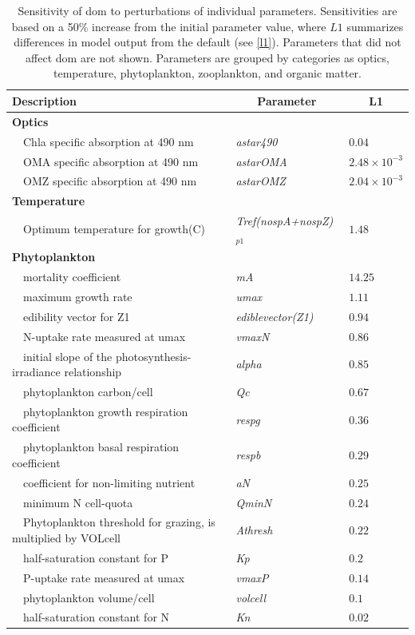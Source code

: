 \documentclass[preprint]{elsarticle}\usepackage[]{graphicx}\usepackage[]{color}
\begin{document}
\begin{table}[!tbp]
{\footnotesize
\caption{Sensitivity of \acl{dom} to perturbations of individual parameters.  Sensitivities are based on a 50\% increase from the initial parameter value, where $L1$ summarizes differences in model output from the default (see \cref{l1}).  Parameters that did not affect \acl{dom} are not shown.  Parameters are grouped by categories as optics, temperature, phytoplankton, zooplankton, and organic matter.\label{tab:om2sens}} 
\begin{center}
\begin{tabular}{lll}
\hline\hline
\multicolumn{1}{l}{Description}&\multicolumn{1}{c}{Parameter}&\multicolumn{1}{c}{L1}\tabularnewline
\hline
{\bfseries Optics}&&\tabularnewline
~~Chla specific absorption at 490 nm&\textit{astar490}&$0.04$\tabularnewline
~~OMA specific absorption at 490 nm&\textit{astarOMA}&$2.48\times 10^{-3}$\tabularnewline
~~OMZ specific absorption at 490 nm&\textit{astarOMZ}&$2.04\times 10^{-3}$\tabularnewline
\hline
{\bfseries Temperature}&&\tabularnewline
~~Optimum temperature for growth(C)&\textit{Tref(nospA+nospZ)$_{p1}$}&$1.48$\tabularnewline
\hline
{\bfseries Phytoplankton}&&\tabularnewline
~~mortality coefficient&\textit{mA}&$14.25$\tabularnewline
~~maximum growth rate&\textit{umax}&$1.11$\tabularnewline
~~edibility vector for Z1&\textit{ediblevector(Z1)}&$0.94$\tabularnewline
~~N-uptake rate measured at umax&\textit{vmaxN}&$0.86$\tabularnewline
~~initial slope of the photosynthesis-irradiance relationship&\textit{alpha}&$0.85$\tabularnewline
~~phytoplankton carbon/cell&\textit{Qc}&$0.67$\tabularnewline
~~phytoplankton growth respiration coefficient&\textit{respg}&$0.36$\tabularnewline
~~phytoplankton basal respiration coefficient&\textit{respb}&$0.29$\tabularnewline
~~coefficient for non-limiting nutrient&\textit{aN}&$0.25$\tabularnewline
~~minimum N cell-quota&\textit{QminN}&$0.24$\tabularnewline
~~Phytoplankton threshold for grazing, is multiplied by VOLcell&\textit{Athresh}&$0.22$\tabularnewline
~~half-saturation constant for P&\textit{Kp}&$0.2$\tabularnewline
~~P-uptake rate measured at umax&\textit{vmaxP}&$0.14$\tabularnewline
~~phytoplankton volume/cell&\textit{volcell}&$0.1$\tabularnewline
~~half-saturation constant for N&\textit{Kn}&$0.02$\tabularnewline

\end{tabular}
\end{center}}
\end{table}
\end{document}
